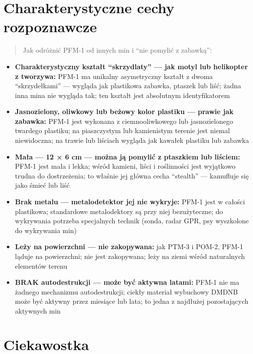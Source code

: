 \documentclass[12pt,openany,oneside]{book}
\providecommand{\tightlist}{%
  \setlength{\itemsep}{0pt}\setlength{\parskip}{0pt}}
\begin{document}
\section{Charakterystyczne cechy
rozpoznawcze}\label{charakterystyczne-cechy-rozpoznawcze-111}

\begin{quote}
Jak odróżnić PFM-1 od innych min i ``nie pomylić z zabawką'':
\end{quote}

\begin{itemize}
\tightlist
\item
  \textbf{Charakterystyczny kształt ``skrzydlaty'' --- jak motyl lub
  helikopter z tworzywa:} PFM-1 ma unikalny asymetryczny kształt z dwoma
  ``skrzydełkami'' --- wygląda jak plastikowa zabawka, ptaszek lub liść;
  żadna inna mina nie wygląda tak; ten kształt jest absolutnym
  identyfikatorem
\item
  \textbf{Jasnozielony, oliwkowy lub beżowy kolor plastiku --- prawie
  jak zabawka:} PFM-1 jest wykonana z ciemnooliwkowego lub
  jasnozielonego twardego plastiku; na piaszczystym lub kamienistym
  terenie jest niemal niewidoczna; na trawie lub liściach wygląda jak
  kawałek plastiku lub zabawka
\item
  \textbf{Mała --- 12 × 6 cm --- można ją pomylić z ptaszkiem lub
  liściem:} PFM-1 jest mała i lekka; wśród kamieni, liści i roślinności
  jest wyjątkowo trudna do dostrzeżenia; to właśnie jej główna cecha
  ``stealth'' --- kamufluje się jako śmieć lub liść
\item
  \textbf{Brak metalu --- metalodetektor jej nie wykryje:} PFM-1 jest w
  całości plastikowa; standardowe metalodektory są przy niej
  bezużyteczne; do wykrywania potrzeba specjalnych technik (sonda, radar
  GPR, psy wyszkolone do wykrywania min)
\item
  \textbf{Leży na powierzchni --- nie zakopywana:} jak PTM-3 i POM-2,
  PFM-1 ląduje na powierzchni; nie jest zakopywana; leży na ziemi wśród
  naturalnych elementów terenu
\item
  \textbf{BRAK autodestrukcji --- może być aktywna latami:} PFM-1 nie ma
  żadnego mechanizmu autodestrukcji; ciekły materiał wybuchowy DMDNB
  może być aktywny przez miesiące lub lata; to jedna z najdłużej
  pozostających aktywnych min
\end{itemize}

\section{Ciekawostka}\label{ciekawostka-111}
\end{document}
